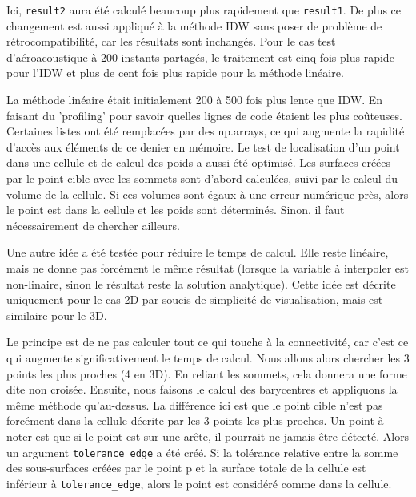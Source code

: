 Ici, \texttt{result2} aura été calculé beaucoup plus rapidement que \texttt{result1}. De plus ce changement est aussi appliqué à la méthode IDW sans poser de problème de rétrocompatibilité, car les résultats sont inchangés. Pour le cas test d'aéroacoustique à 200 instants partagés, le traitement est cinq fois plus rapide pour l'IDW et plus de cent fois plus rapide pour la méthode linéaire.




\vspace{0.5cm}

La méthode linéaire était initialement 200 à 500 fois plus lente que IDW. En faisant du 'profiling' pour savoir quelles lignes de code étaient les plus coûteuses. Certaines listes ont été remplacées par des np.arrays, ce qui augmente la rapidité d'accès aux éléments de ce denier en mémoire.
Le test de localisation d'un point dans une cellule et de calcul des poids a aussi été optimisé.
Les surfaces créées par le point cible avec les sommets sont d'abord calculées, suivi par le calcul du volume de la cellule. Si ces volumes sont égaux à une erreur numérique près, alors le point est dans la cellule et les poids sont déterminés. Sinon, il faut nécessairement de chercher ailleurs.

\vspace{0.5cm}

Une autre idée a été testée pour réduire le temps de calcul. Elle reste linéaire, mais ne donne pas forcément le même résultat (lorsque la variable à interpoler est non-linaire, sinon le résultat reste la solution analytique). Cette idée est décrite uniquement pour le cas 2D par soucis de simplicité de visualisation, mais est similaire pour le 3D.

Le principe est de ne pas calculer tout ce qui touche à la connectivité, car c'est ce qui augmente significativement le temps de calcul.
Nous allons alors chercher les 3 points les plus proches (4 en 3D). En reliant les sommets, cela donnera une forme dite non croisée. 
Ensuite, nous faisons le calcul des barycentres et appliquons la même méthode qu'au-dessus.
La différence ici est que le point cible n'est pas forcément dans la cellule décrite par les 3 points les plus proches.
Un point à noter est que si le point est sur une arête, il pourrait ne jamais être détecté. Alors un argument \texttt{tolerance\_edge} a été créé. Si la tolérance relative entre la somme des sous-surfaces créées par le point p et la surface totale de la cellule est inférieur à \texttt{tolerance\_edge}, alors le point est considéré comme dans la cellule.%


